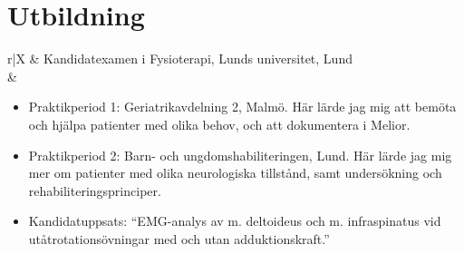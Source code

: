 \documentclass[11pt,a4paper]{article}
\begin{document}
\section{Utbildning}
\begin{tabularx}{\textwidth}{r|X}	
	& Kandidatexamen i Fysioterapi, Lunds universitet, Lund\\
	&\footnotesize{\vspace{-5pt}
		 \begin{itemize}[leftmargin=10pt, topsep=-12.5pt]

		\item Praktikperiod 1: Geriatrikavdelning 2, Malmö. Här lärde jag mig att bemöta och hjälpa patienter med olika behov, och att dokumentera i Melior.
		\item Praktikperiod 2: Barn- och ungdomshabiliteringen, Lund. Här lärde jag mig mer om patienter med olika neuro\-logiska tillstånd, samt undersökning och rehabiliteringsprinciper.
		\item Kandidatuppsats: ``EMG-analys av m. deltoideus och m. infraspinatus vid utåt\-rotations\-övningar med och utan adduktionskraft.''
		\end{itemize}\vspace{-30pt} 
	}\\
	 \\
\end{tabularx}

\end{document}
